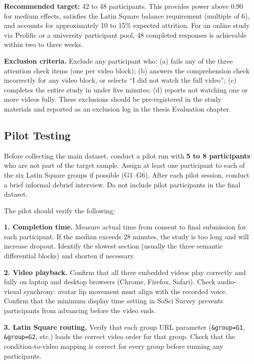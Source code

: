 \documentclass[11pt, a4paper]{article}
\begin{document}
\textbf{Recommended target:} 42 to 48 participants. This provides power above 0.90 for medium effects, satisfies the Latin Square balance requirement (multiple of 6), and accounts for approximately 10 to 15\% expected attrition. For an online study via Prolific or a university participant pool, 48 completed responses is achievable within two to three weeks.

\begin{warnbox}
\textbf{Exclusion criteria.} Exclude any participant who: (a) fails any of the three attention check items (one per video block); (b) answers the comprehension check incorrectly for any video block, or selects ``I did not watch the full video''; (c) completes the entire study in under five minutes; (d) reports not watching one or more videos fully. These exclusions should be pre-registered in the study materials and reported as an exclusion log in the thesis Evaluation chapter.
\end{warnbox}

\subsection{Pilot Testing}

Before collecting the main dataset, conduct a pilot run with \textbf{5 to 8 participants} who are not part of the target sample. Assign at least one participant to each of the six Latin Square groups if possible (G1--G6). After each pilot session, conduct a brief informal debrief interview. Do not include pilot participants in the final dataset.

The pilot should verify the following:

\textbf{1. Completion time.}
Measure actual time from consent to final submission for each participant. If the median exceeds 28 minutes, the study is too long and will increase dropout. Identify the slowest section (usually the three semantic differential blocks) and shorten if necessary.

\textbf{2. Video playback.}
Confirm that all three embedded videos play correctly and fully on laptop and desktop browsers (Chrome, Firefox, Safari). Check audio-visual synchrony: avatar lip movement must align with the recorded voice. Confirm that the minimum display time setting in SoSci Survey prevents participants from advancing before the video ends.

\textbf{3. Latin Square routing.}
Verify that each group URL parameter (\texttt{\&group=G1}, \texttt{\&group=G2}, etc.) loads the correct video order for that group. Check that the condition-to-video mapping is correct for every group before running any participants.
\end{document}
